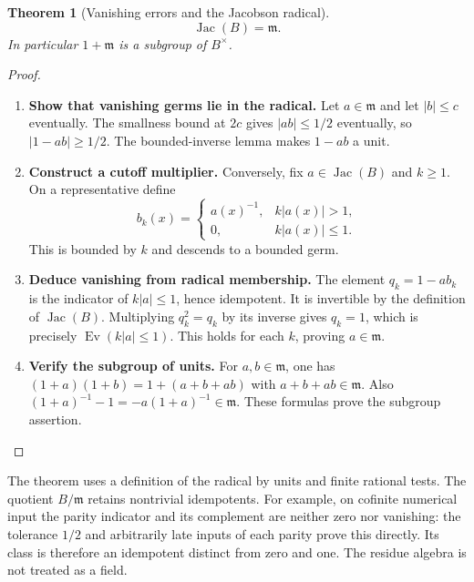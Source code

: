 \documentclass[11pt,a4paper]{article}
\numberwithin{algorithm}{section}
\numberwithin{equation}{section}
\newtheorem{theorem}{Theorem}[section]
\theoremstyle{definition}
\theoremstyle{remark}
\theoremstyle{plain}
\newcommand{\Ev}{{\operatorname{Ev}}}
\newcommand{\abs}[1]{\lvert #1\rvert}
\newcommand{\Jac}{\operatorname{Jac}}
\theoremstyle{definition}
\theoremstyle{plain}
\begin{document}
\begin{theorem}[Vanishing errors and the Jacobson radical]
\label{thm:jacobson}
\[
 \Jac(B)=\mathfrak m.
\]
In particular $1+\mathfrak m$ is a subgroup of $B^\times$.
\end{theorem}
\begin{proof}\leavevmode
\begin{enumerate}[leftmargin=*,align=left]
\item \textbf{Show that vanishing germs lie in the radical.}
Let $a\in\mathfrak m$ and let $\abs b\le c$ eventually.
The smallness bound at $2c$ gives $\abs{ab}\le1/2$ eventually,
so $\abs{1-ab}\ge1/2$. The bounded-inverse lemma makes $1-ab$
a unit.

\item \textbf{Construct a cutoff multiplier.}
Conversely, fix $a\in\Jac(B)$ and $k\ge1$. On a representative
define
\[
 b_k(x)=
 \begin{cases}
  a(x)^{-1},&k\abs{a(x)}>1,\\
  0,&k\abs{a(x)}\le1.
 \end{cases}
\]
This is bounded by $k$ and descends to a bounded germ.

\item \textbf{Deduce vanishing from radical membership.}
The element $q_k=1-ab_k$ is the indicator of
$k\abs a\le1$, hence idempotent. It is invertible by the
definition of $\Jac(B)$. Multiplying $q_k^2=q_k$ by its inverse
gives $q_k=1$, which is precisely $\Ev(k\abs a\le1)$.
This holds for each $k$, proving $a\in\mathfrak m$.

\item \textbf{Verify the subgroup of units.}
For $a,b\in\mathfrak m$, one has
$(1+a)(1+b)=1+(a+b+ab)$ with $a+b+ab\in\mathfrak m$.
Also $(1+a)^{-1}-1=-a(1+a)^{-1}\in\mathfrak m$.
These formulas prove the subgroup assertion.
\end{enumerate}
\end{proof}

The theorem uses a definition of the radical by units and finite
rational tests. The quotient
$B/\mathfrak m$ retains nontrivial idempotents. For example, on
cofinite numerical input the parity indicator and its complement
are neither zero nor vanishing: the tolerance $1/2$ and
arbitrarily late inputs of each parity prove this directly.
Its class is therefore an idempotent distinct from zero and one.
The residue algebra is not treated as a field.
\end{document}
